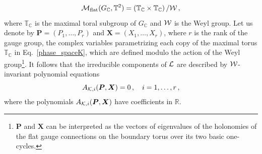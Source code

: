 \documentclass[a4paper,11pt]{article}
\theoremstyle{definition}
\newcommand{\CK}{{\cal K}}
\newcommand{\CL}{{\cal L}}
\newcommand{\CM}{{\cal M}}
\newcommand{\CW}{{\cal W}}
\def\IR{{\mathbb R}}
\def\IC{{\mathbb C}}
\def\IT{{\mathbb T}}
\newcommand{\be}{\begin{equation}}
\newcommand{\ee}{\end{equation}}
\begin{document}
\be \label{phase_spaceK}
\CM_{\rm{flat}} (G_{\IC}, \IT^2) = \left( \IT_{\IC} \times \IT_{\IC} \right) / \CW \, ,
\ee
where $\IT_{\IC}$ is the maximal toral subgroup of $G_{\IC}$ and $\CW$ is the Weyl group.
%
Let us denote by $\bm{P}=(P_1, \dots, P_r)$ and $\bm{X}=(X_1, \dots, X_r)$, where $r$ is the rank of the gauge group, the complex variables parametrizing each copy of the maximal torus $\IT_{\IC}$ in Eq.~\eqref{phase_spaceK}, which are defined modulo the action of the Weyl group\footnote{$\bm{P}$ and $\bm{X}$ can be interpreted as the vectors of eigenvalues of the holonomies of the flat gauge connections on the boundary torus over its two basic one-cycles.}. 
It follows that the irreducible components of $\CL$ are described by $\CW$-invariant polynomial equations
\be \label{Apoly_eqs}
A_{\CK, i} (\bm{P}, \bm{X}) = 0 \, , \quad i=1, \dots, r \, ,
\ee
where the polynomials $A_{\CK, i} (\bm{P}, \bm{X})$ have coefficients in $\IR$.
\end{document}
